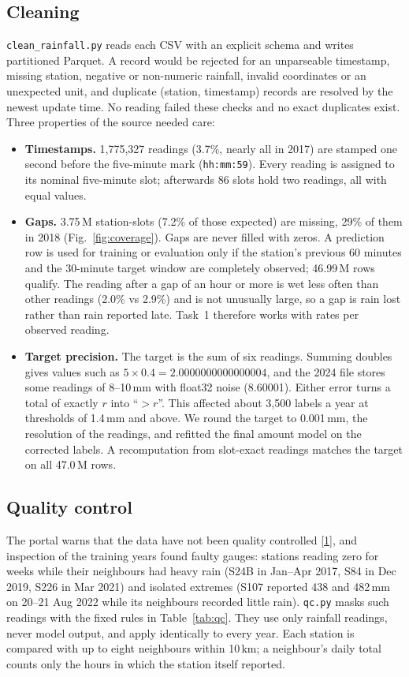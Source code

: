 \documentclass[lang=en,11pt,a4paper,bibend=bibtex]{elegantpaper}
\newcommand{\mm}{\,mm}
\begin{document}
\subsection{Cleaning}
\texttt{clean\_rainfall.py} reads each CSV with an explicit schema and writes partitioned Parquet. A record would be rejected for an unparseable timestamp, missing station, negative or non-numeric rainfall, invalid coordinates or an unexpected unit, and duplicate (station, timestamp) records are resolved by the newest update time. No reading failed these checks and no exact duplicates exist. Three properties of the source needed care:
\begin{itemize}[leftmargin=1.5em,itemsep=3pt]
\item \textbf{Timestamps.} 1,775,327 readings (3.7\%, nearly all in 2017) are stamped one second before the five-minute mark (\texttt{hh:mm:59}). Every reading is assigned to its nominal five-minute slot; afterwards 86 slots hold two readings, all with equal values.
\item \textbf{Gaps.} 3.75\,M station-slots (7.2\% of those expected) are missing, 29\% of them in 2018 (Fig.~\ref{fig:coverage}). Gaps are never filled with zeros. A prediction row is used for training or evaluation only if the station's previous 60 minutes and the 30-minute target window are completely observed; 46.99\,M rows qualify. The reading after a gap of an hour or more is wet less often than other readings (2.0\% vs 2.9\%) and is not unusually large, so a gap is rain lost rather than rain reported late. Task~1 therefore works with rates per observed reading.
\item \textbf{Target precision.} The target is the sum of six readings. Summing doubles gives values such as $5\times0.4 = 2.0000000000000004$, and the 2024 file stores some readings of 8--10\mm{} with float32 noise (8.60001). Either error turns a total of exactly $r$ into ``$>r$''. This affected about 3,500 labels a year at thresholds of 1.4\mm{} and above. We round the target to 0.001\mm, the resolution of the readings, and refitted the final amount model on the corrected labels. A recomputation from slot-exact readings matches the target on all 47.0\,M rows.
\end{itemize}

\subsection{Quality control}\label{sec:qc}
The portal warns that the data have not been quality controlled \hyperref[ref:1]{[1]}, and inspection of the training years found faulty gauges: stations reading zero for weeks while their neighbours had heavy rain (S24B in Jan--Apr 2017, S84 in Dec 2019, S226 in Mar 2021) and isolated extremes (S107 reported 438 and 482\mm{} on 20--21 Aug 2022 while its neighbours recorded little rain). \texttt{qc.py} masks such readings with the fixed rules in Table~\ref{tab:qc}. They use only rainfall readings, never model output, and apply identically to every year. Each station is compared with up to eight neighbours within 10\,km; a neighbour's daily total counts only the hours in which the station itself reported.
\end{document}
